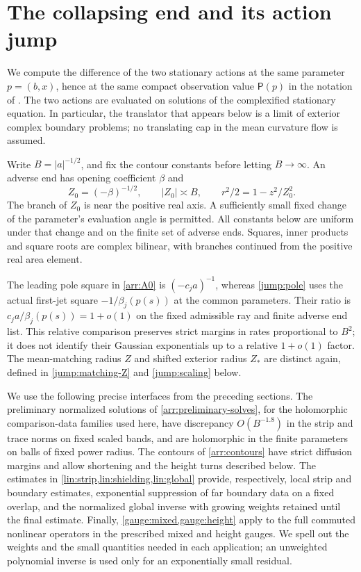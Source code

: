 \section{The collapsing end and its action jump}\label{sec:jump}

We compute the difference of the two stationary actions at the same
parameter $p=(b,x)$, hence at the same compact observation value
$\mathsf P(p)$ in the notation of .
The two actions are evaluated on solutions of the
complexified stationary equation.  In particular, the translator that
appears below is a limit of exterior complex boundary problems; no
translating cap in the mean curvature flow is assumed.

Write $B=|a|^{-1/2}$, and fix the contour constants before letting
$B\longrightarrow\infty$.  An adverse end has opening coefficient $\beta$
and
\begin{equation}\label{jump:pole}
 Z_0=(-\beta)^{-1/2},\qquad |Z_0|\asymp B,
 \qquad r^2/2=1-z^2/Z_0^2.
\end{equation}
The branch of $Z_0$ is near the positive real axis.  A sufficiently small
fixed change of the parameter's evaluation angle is permitted.  All
constants below are uniform under that change and on the finite set of
adverse ends.  Squares, inner products and square roots are complex
bilinear, with branches continued from the positive real area element.

The leading pole square in \eqref{arr:A0} is $(-c_ja)^{-1}$,
whereas \eqref{jump:pole} uses the actual first-jet square
$-1/\beta_j(p(s))$ at the common parameters.  Their ratio is
$c_ja/\beta_j(p(s))=1+o(1)$ on the fixed admissible ray and finite
adverse end list.  This relative comparison preserves strict margins
in rates proportional to $B^2$; it does not identify their Gaussian
exponentials up to a relative $1+o(1)$ factor.  The mean-matching radius
$Z$ and shifted exterior radius $Z_*$ are distinct again, defined in
\eqref{jump:matching-Z} and \eqref{jump:scaling} below.

We use the following precise interfaces from the preceding sections.
The preliminary normalized solutions of
\cref{arr:preliminary-solves}, for the holomorphic comparison-data
families used here, have discrepancy $O(B^{-1.8})$ in the strip
and trace norms on fixed scaled bands, and are holomorphic in the finite
parameters on balls of fixed power radius.  The contours of
\cref{arr:contours} have strict diffusion margins and allow shortening
and the height turns described below.  The estimates in
\cref{lin:strip,lin:shielding,lin:global} provide, respectively, local
strip and boundary estimates, exponential suppression of far boundary
data on a fixed overlap, and the normalized global inverse with growing
weights retained until the final estimate.  Finally,
\cref{gauge:mixed,gauge:height} apply to the full commuted nonlinear
operators in the prescribed mixed and height gauges.  We spell out the
weights and the small quantities needed in each application; an
unweighted polynomial inverse is used only for an exponentially small
residual.

